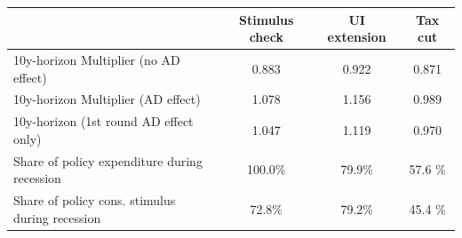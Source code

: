 \begin{tabular}{@{}lccc@{}} 
\toprule 
& Stimulus check    & UI extension    & Tax cut     \\  \midrule 
10y-horizon Multiplier (no AD effect) &0.883  & 0.922  & 0.871     \\ 
10y-horizon Multiplier (AD effect) &1.078  & 1.156  & 0.989     \\ 
10y-horizon (1st round AD effect only) &1.047  & 1.119  & 0.970     \\ 
Share of policy expenditure during recession &100.0\%  & 79.9\%  & 57.6 \%    \\ 
Share of policy cons. stimulus during recession &72.8\%  & 79.2\%  & 45.4 \%    \\ \bottomrule 
\end{tabular}  
